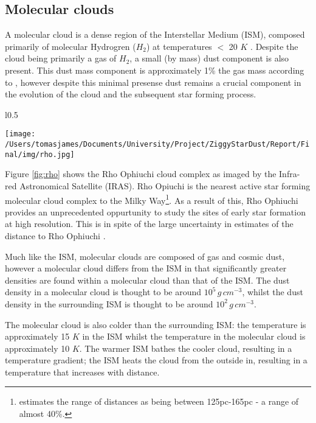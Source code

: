\documentclass{report}
\begin{document}
\subsection{Molecular clouds}
A molecular cloud is a dense region of the Interstellar Medium (ISM), composed primarily of molecular Hydrogren ($H_{2}$) at temperatures $<$ 20 $K$ \parencite{dustopacity}. Despite the cloud being primarily a gas of $H_{2}$, a small (by mass) dust component is also present. This dust mass component is approximately 1\% the gas mass according to \textcite{noise}, however despite this minimal presense dust remains a crucial component in the evolution of the cloud and the subsequent star forming process.

\begin{wrapfigure}{l}{0.5\textwidth}
  \begin{center}
    \texttt{[image: /Users/tomasjames/Documents/University/Project/ZiggyStarDust/Report/Final/img/rho.jpg]}
    \caption[An IRAS image showing the Rho Opiuchi cloud complex \parencite{rho}.]{An IRAS image showing the Rho Opiuchi cloud complex \parencite{rho}.}
  \end{center}
  \label{fig:rho}
\end{wrapfigure}

Figure \ref{fig:rho} shows the Rho Ophiuchi cloud complex as imaged by the Infra-red Astronomical Satellite (IRAS). Rho Opiuchi is the nearest active star forming molecular cloud complex to the Milky Way\footnote{\textcite{rho-dist} estimates the range of distances as being between 125pc-165pc - a range of almost 40\%.}. As a result of this, Rho Ophiuchi provides an unprecedented oppurtunity to study the sites of early star formation at high resolution. This is in spite of the large uncertainty in estimates of the distance to Rho Ophiuchi \parencite{rho-dist}.

Much like the ISM, molecular clouds are composed of gas and cosmic dust, however a molecular cloud differs from the ISM in that significantly greater densities are found within a molecular cloud than that of the ISM. The dust density in a molecular cloud is thought to be around $10^{5}\,g\,cm^{-3}$, whilst the dust density in the surrounding ISM is thought to be around $10^{2}\,g\,cm^{-3}$.

The molecular cloud is also colder than the surrounding ISM: the temperature is approximately 15 $K$ in the ISM whilst the temperature in the molecular cloud is approximately 10 $K$. The warmer ISM bathes the cooler cloud, resulting in a temperature gradient; the ISM heats the cloud from the outside in, resulting in a temperature that increases with distance.
\end{document}
